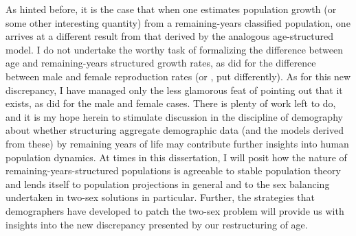 As hinted before, it is the case that when one estimates population growth (or
some other interesting quantity) from a remaining-years classified population,
one arrives at a different result from that derived by the analogous
age-structured model. I do not undertake the worthy task of formalizing the
difference between age and remaining-years structured growth rates, as did
\citet{karmel1947relations} for the difference between male and female
reproduction rates (or \citet{coale1972growth}, put differently). As for this
new discrepancy, I have managed only the less glamorous feat of pointing out
that it exists, as did \citet{kuczynski1932fertility} for the male
and female cases. There is plenty of work left to do, and it is my hope herein
to stimulate discussion in the discipline of demography about whether structuring
aggregate demographic data (and the models derived from these) by remaining
years of life may contribute further insights into human population dynamics. At
times in this dissertation, I will posit how the nature of
remaining-years-structured populations is agreeable to stable population theory
and lends itself to population projections in general and to the sex balancing
undertaken in two-sex solutions in particular. Further, the strategies that
demographers have developed to patch the two-sex problem will provide us with
insights into the new discrepancy presented by our restructuring of age.
